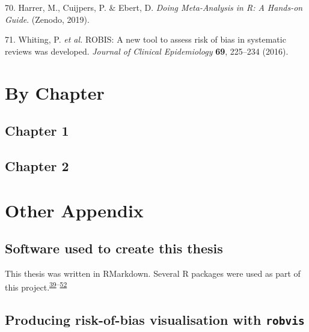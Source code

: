 \documentclass[a4paper, twoside]{templates/ociamthesis}
\begin{document}
\leavevmode\hypertarget{ref-mathias_harrer_2019_2551803}{}%
70. Harrer, M., Cuijpers, P. \& Ebert, D. \emph{Doing Meta-Analysis in R: A Hands-on Guide}. (Zenodo, 2019).

\leavevmode\hypertarget{ref-whiting2016robis}{}%
71. Whiting, P. \emph{et al.} ROBIS: A new tool to assess risk of bias in systematic reviews was developed. \emph{Journal of Clinical Epidemiology} \textbf{69}, 225--234 (2016).

\startappendices

\hypertarget{chapter-appendix-heading}{%
\chapter{By Chapter}\label{chapter-appendix-heading}}

\hypertarget{appendix-chapter-1}{%
\section{Chapter 1}\label{appendix-chapter-1}}

\hypertarget{appendix-chapter-2}{%
\section{Chapter 2}\label{appendix-chapter-2}}

\hypertarget{other-appendix-heading}{%
\chapter{Other Appendix}\label{other-appendix-heading}}

\hypertarget{software-used-to-create-this-thesis}{%
\section{Software used to create this thesis}\label{software-used-to-create-this-thesis}}

This thesis was written in RMarkdown.
Several R packages were used as part of this project.\textsuperscript{\protect\hyperlink{ref-base}{39}--\protect\hyperlink{ref-xfun}{52}}

\hypertarget{appendix-robvis}{%
\section{\texorpdfstring{Producing risk-of-bias visualisation with \texttt{robvis}}{Producing risk-of-bias visualisation with robvis}}\label{appendix-robvis}}
\end{document}
